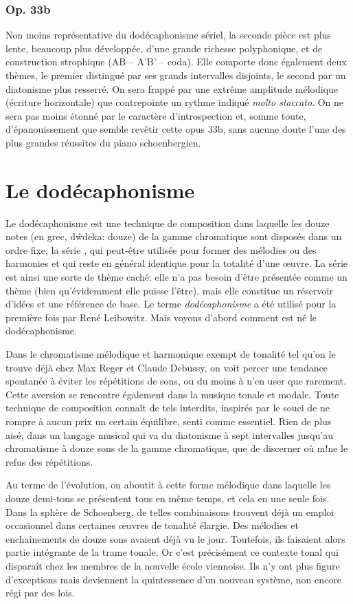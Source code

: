 \documentclass[11pt,a4paper]{scrreprt}
\begin{document}
\subsection{Op. 33b}
Non moins représentative du dodécaphonisme sériel, la seconde pièce est plus lente, beaucoup plus développée, d'une grande richesse polyphonique, et de construction strophique (AB -- A'B' -- coda). Elle comporte donc également deux thèmes, le premier distingué par ses grands intervalles disjoints, le second par un diatonisme plus resserré. On sera frappé par une extrême amplitude mélodique (écriture horizontale) que contrepointe un rythme indiqué \emph{molto staccato}. On ne sera pas moins étonné par le caractère d'introspection et, somme toute, d'épanouissement que semble revêtir cette opus 33b, sans aucune doute l'une des plus grandes réussites du piano schoenbergien.

\chapter{Le dodécaphonisme}
Le dodécaphonisme est une technique de composition dans laquelle les douze notes (en grec, \greektext d\'wdeka\latintext{}: douze) de la gamme chromatique sont disposés dans un ordre fixe, la \og{} série \fg{}, qui peut-être utilisée pour former des mélodies ou des harmonies et qui reste en général identique pour la totalité d'une \oe{}uvre. La série
est ainsi une sorte de thème caché: elle n'a pas besoin d'être présentée comme un thème (bien qu'évidemment elle puisse l'être), mais elle constitue un réservoir d'idées et une référence de base. Le terme \emph{dodécaphonisme} a été utilisé pour la première fois par René Leibowitz. Mais voyons d'abord comment est né le dodécaphonisme.

Dans le chromatisme mélodique et harmonique exempt de tonalité tel qu'on le trouve déjà chez Max Reger et Claude Debussy, on voit percer une tendance spontanée à éviter les répétitions de sons, ou du moins à n'en user que rarement. Cette aversion se rencontre également dans la musique tonale et modale. Toute technique de composition connaît de tels interdits, inspirés par le souci de ne rompre à aucun prix un certain équilibre, senti comme essentiel. Rien de plus aisé, dans un langage musical qui va du diatonisme à sept intervalles jusqu'au chromatisme à douze sons de la gamme chromatique, que de discerner où m!ne le refus des répétitions.

Au terme de l'évolution, on aboutit à cette forme mélodique dans laquelle les douze demi-tons se présentent tous en même temps, et cela en une seule fois. Dans la sphère de Schoenberg, de telles combinaisons trouvent déjà un emploi occasionnel dans certaines \oe{}uvres de tonalité élargie. Des mélodies et enchaînements de douze sons avaient déjà vu le jour. Toutefois, ils faisaient alors partie intégrante de la trame tonale. Or c'est précisément ce contexte tonal qui disparaît chez les membres de la nouvelle école viennoise. Ils n'y ont plus figure d'exceptions mais deviennent la quintessence d'un nouveau système, non encore régi par des lois.
\end{document}

